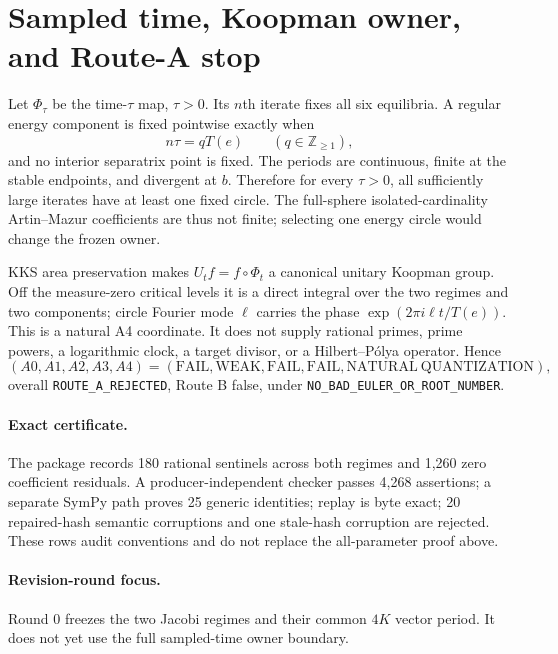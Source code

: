 \documentclass[8pt]{extarticle}
\begin{document}
\section{Sampled time, Koopman owner, and Route-A stop}
Let $\Phi_\tau$ be the time-$\tau$ map, $\tau>0$.  Its $n$th iterate fixes
all six equilibria.  A regular energy component is fixed pointwise exactly
when
\begin{equation}
 n\tau=qT(e)\qquad(q\in\mathbb Z_{\ge1}),             \tag{9}
\end{equation}
and no interior separatrix point is fixed.  The periods are continuous,
finite at the stable endpoints, and divergent at $b$.  Therefore for every
$\tau>0$, all sufficiently large iterates have at least one fixed circle.
The full-sphere isolated-cardinality Artin--Mazur coefficients are thus not
finite; selecting one energy circle would change the frozen owner.

KKS area preservation makes $U_t f=f\circ\Phi_t$ a canonical unitary
Koopman group.  Off the measure-zero critical levels it is a direct integral
over the two regimes and two components; circle Fourier mode $\ell$ carries
the phase $\exp(2\pi i\ell t/T(e))$.  This is a natural A4 coordinate.
It does not supply rational primes, prime powers, a logarithmic clock, a
target divisor, or a Hilbert--Pólya operator.  Hence
\[
 (A0,A1,A2,A3,A4)=(\mathrm{FAIL},\mathrm{WEAK},\mathrm{FAIL},
 \mathrm{FAIL},\mathrm{NATURAL\ QUANTIZATION}),
\]
overall \texttt{ROUTE\_A\_REJECTED}, Route B false, under
\texttt{NO\_BAD\_EULER\_OR\_ROOT\_NUMBER}.

\paragraph{Exact certificate.}
The package records 180 rational sentinels across both regimes and 1,260
zero coefficient residuals.  A producer-independent checker passes 4,268
assertions; a separate SymPy path proves 25 generic identities; replay is
byte exact; 20 repaired-hash semantic corruptions and one stale-hash
corruption are rejected.  These rows audit conventions and do not replace
the all-parameter proof above.

\ifcase\CRevisionRound
\paragraph{Revision-round focus.} Round 0 freezes the two Jacobi regimes and
their common $4K$ vector period.  It does not yet use the full sampled-time
owner boundary.
\or
\end{document}
